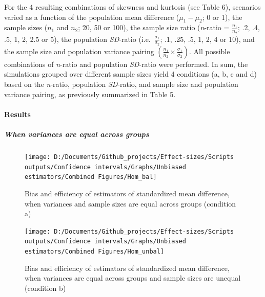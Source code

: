 \documentclass[
  man,floatsintext]{apa6}
\begin{document}
For the 4 resulting combinations of skewness and kurtosis (see Table 6), scenarios varied as a function of the population mean difference (\(\mu_1-\mu_2\); 0 or 1), the sample sizes (\emph{\(n_1\)} and \emph{\(n_2\)}; 20, 50 or 100), the sample size ratio (\emph{n}-ratio = \(\frac{n_1}{n_2}\); .2, .4, .5, 1, 2, 2.5 or 5), the population \emph{SD}-ratio (i.e.~\(\frac{\sigma_1}{\sigma_2}\); .1, .25, .5, 1, 2, 4 or 10), and the sample size and population variance pairing \(\left(\frac{n_1}{n_2}\times\frac{\sigma_1}{\sigma_2}\right)\). All possible combinations of \emph{n}-ratio and population \emph{SD}-ratio were performed. In sum, the simulations grouped over different sample sizes yield 4 conditions (a, b, c and d) based on the \emph{n}-ratio, population \emph{SD}-ratio, and sample size and population variance pairing, as previously summarized in Table 5.

\hypertarget{results-1}{%
\paragraph{Results}\label{results-1}}

\hypertarget{when-variances-are-equal-across-groups-1}{%
\subparagraph{When variances are equal across groups}\label{when-variances-are-equal-across-groups-1}}

\begin{figure}

{\centering \texttt{[image: D:/Documents/Github\_projects/Effect-sizes/Scripts outputs/Confidence intervals/Graphs/Unbiased estimators/Combined Figures/Hom\_bal]} 

}

\caption{Bias and efficiency of estimators of standardized mean difference, when variances and sample sizes are equal across groups (condition a)}\label{fig:idHombalbis}
\end{figure}

\begin{figure}

{\centering \texttt{[image: D:/Documents/Github\_projects/Effect-sizes/Scripts outputs/Confidence intervals/Graphs/Unbiased estimators/Combined Figures/Hom\_unbal]} 

}

\caption{Bias and efficiency of estimators of standardized mean difference, when variances are equal across groups and sample sizes are unequal (condition b)}\label{fig:idHomunbalbis}
\end{figure}
\end{document}
